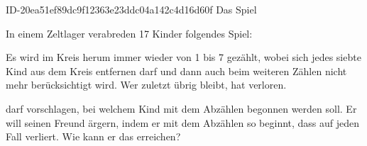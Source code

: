 \begin{exercise}
      {ID-20ea51ef89dc9f12363e23ddc04a142c4d16d60f}
      {Das Spiel}
  \ifproblem\problem\par
    In einem Zeltlager verabreden 17 Kinder folgendes Spiel:\par
    Es wird im Kreis herum immer wieder von 1 bis 7 gezählt, wobei sich jedes
    siebte Kind aus dem Kreis entfernen darf und dann auch beim weiteren
    Zählen nicht mehr berücksichtigt wird. Wer zuletzt übrig bleibt, hat
    verloren.\par
    \xya{} darf vorschlagen, bei welchem Kind mit dem Abzählen begonnen
    werden soll. Er will seinen Freund \xyb{} ärgern, indem er mit dem
    Abzählen so beginnt, dass \xyb{} auf jeden Fall verliert. Wie kann
    er das erreichen?
  \fi
\end{exercise}
